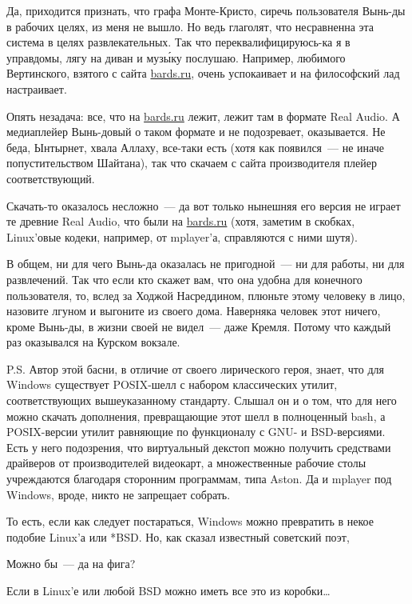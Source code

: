 Да, приходится признать, что графа Монте-Кристо, сиречь пользователя Вынь-ды в рабочих целях, из меня не вышло. Но ведь глаголят, что несравненна эта система в целях развлекательных. Так что переквалифицируюсь-ка я в управдомы, лягу на диван и муз\'{ы}ку послушаю. Например, любимого Вертинского, взятого с сайта \href{http://bards.ru}{bards.ru}, очень успокаивает и на философский лад настраивает.

Опять незадача: все, что на \href{http://bards.ru}{bards.ru} лежит, лежит там в формате Real Audio. А медиаплейер Вынь-довый о таком формате и не подозревает, оказывается. Не беда, Ынтырнет, хвала Аллаху, все-таки есть (хотя как появился~--- не иначе попустительством Шайтана), так что скачаем с сайта производителя плейер соответствующий.

Скачать-то оказалось несложно~--- да вот только нынешняя его версия не играет те древние Real Audio, что были на \href{http://bards.ru}{bards.ru} (хотя, заметим в скобках, Linux'овые кодеки, например, от mplayer'а, справляются с ними шутя).

В общем, ни для чего Вынь-да оказалась не пригодной~--- ни для работы, ни для развлечений. Так что если кто скажет вам, что она удобна для конечного пользователя, то, вслед за Ходжой Насреддином, плюньте этому человеку в лицо, назовите лгуном и выгоните из своего дома. Наверняка человек этот ничего, кроме Вынь-ды, в жизни своей не видел~--- даже Кремля. Потому что каждый раз оказывался на Курском вокзале.

P.S. Автор этой басни, в отличие от своего лирического героя, знает, что для Windows существует POSIX-шелл с набором классических утилит, соответствующих вышеуказанному стандарту. Слышал он и о том, что для него можно скачать дополнения, превращающие этот шелл в полноценный bash, а POSIX-версии утилит равняющие по функционалу с GNU- и BSD-версиями. Есть у него подозрения, что виртуальный декстоп можно получить средствами драйверов от производителей видеокарт, а множественные рабочие столы учреждаются благодаря сторонним программам, типа Aston. Да и mplayer под Windows, вроде, никто не запрещает собрать.

То есть, если как следует постараться, Windows можно превратить в некое подобие Linux'а или *BSD. Но, как сказал известный советский поэт,


\begin{shadequote}{}
Можно бы~--- да на фига?
\end{shadequote}

Если в Linux'е или любой BSD можно иметь все это из коробки\dots

